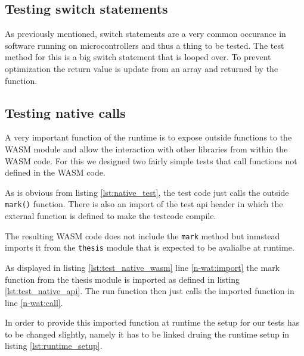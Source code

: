 \subsection{Testing switch statements}



As previously mentioned, switch statements are a very common occurance in software running on microcontrollers and thus a thing to be tested. The test method for this is a big switch statement that is looped over. To prevent optimization the return value is update from an array and returned by the function.

\subsection{Testing native calls}\label{subsec:native}

A very important function of the runtime is to expose outside functions to the WASM module and allow the interaction with other libraries from within the WASM code. For this we designed two fairly simple tests that call functions not defined in the WASM code.



As is obvious from listing \ref{lst:native_test}, the test code just calls the outside \lstinline{mark()} function. There is also an import of the test api header in which the external function is defined to make the testcode compile.



The resulting WASM code does not include the \lstinline{mark} method but inmstead imports it from the \lstinline{thesis} module that is expected to be avalialbe at runtime.



As displayed in listing \ref{lst:test_native_wasm} line \ref{n-wat:import} the mark function from the thesis module is imported as defined in listing \ref{lst:test_native_api}. The run function then just calls the imported function in line \ref{n-wat:call}.

In order to provide this imported function at runtime the setup for our tests has to be changed slightly, namely it has to be linked druing the runtime setup in listing \ref{lst:runtime_setup}.

